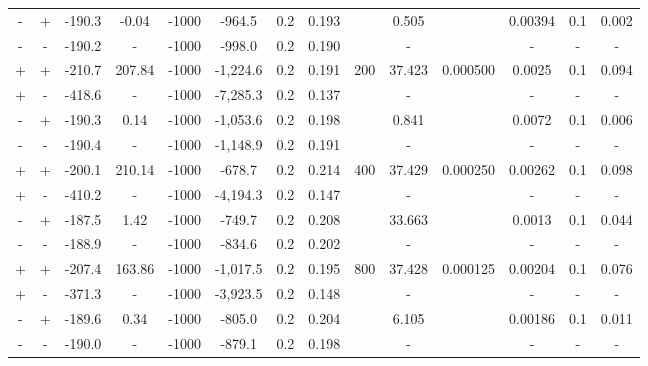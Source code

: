 \documentclass[11pt]{article}
\begin{document}
\begin{table}
{\begin{tabular}{cccccccccccccc}
         - &        + & -190.3 &     -0.04 & -1000 &    -964.5 &  0.2 &  0.193 &   &   0.505 &   &  0.00394 &     0.1 &       0.002 \\
         - &        - & -190.2 &         - & -1000 &    -998.0 &  0.2 &  0.190 &   &       - &   &        - &       - &           - \\ \midrule
         + &        + & -210.7 &    207.84 & -1000 &  -1,224.6 &  0.2 &  0.191 &  \multirow{4}{*}{200} &  37.423 &  \multirow{4}{*}{0.000500} &   0.0025 &     0.1 &       0.094 \\
         + &        - & -418.6 &         - & -1000 &  -7,285.3 &  0.2 &  0.137 &   &       - &   &        - &       - &           - \\
         - &        + & -190.3 &      0.14 & -1000 &  -1,053.6 &  0.2 &  0.198 &   &   0.841 &   &   0.0072 &     0.1 &       0.006 \\
         - &        - & -190.4 &         - & -1000 &  -1,148.9 &  0.2 &  0.191 &   &       - &   &        - &       - &           - \\ \midrule
         + &        + & -200.1 &    210.14 & -1000 &    -678.7 &  0.2 &  0.214 &  \multirow{4}{*}{400} &  37.429 &  \multirow{4}{*}{0.000250} &  0.00262 &     0.1 &       0.098 \\
         + &        - & -410.2 &         - & -1000 &  -4,194.3 &  0.2 &  0.147 &   &       - &   &        - &       - &           - \\
         - &        + & -187.5 &      1.42 & -1000 &    -749.7 &  0.2 &  0.208 &   &  33.663 &   &   0.0013 &     0.1 &       0.044 \\
         - &        - & -188.9 &         - & -1000 &    -834.6 &  0.2 &  0.202 &   &       - &   &        - &       - &           - \\  \midrule
         + &        + & -207.4 &    163.86 & -1000 &  -1,017.5 &  0.2 &  0.195 &  \multirow{4}{*}{800} &  37.428 &  \multirow{4}{*}{0.000125} &  0.00204 &     0.1 &       0.076 \\
         + &        - & -371.3 &         - & -1000 &  -3,923.5 &  0.2 &  0.148 &   &       - &   &        - &       - &           - \\
         - &        + & -189.6 &      0.34 & -1000 &    -805.0 &  0.2 &  0.204 &   &   6.105 &   &  0.00186 &     0.1 &       0.011 \\
         - &        - & -190.0 &         - & -1000 &    -879.1 &  0.2 &  0.198 &   &       - &   &        - &       - &           - \\
\bottomrule
\end{tabular}
}
\label{tab:polyDFE}

\end{table}
\end{document}

